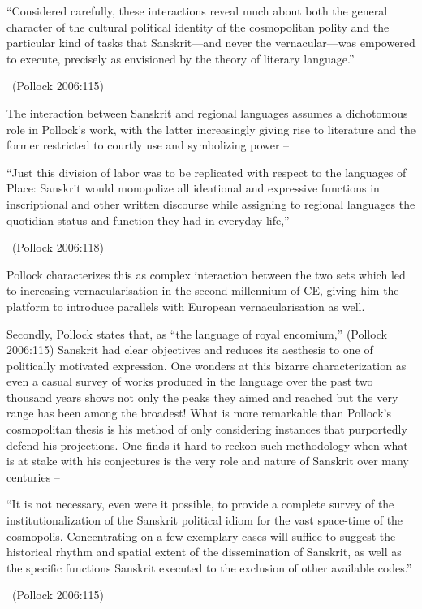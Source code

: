\begin{myquote}
“Considered carefully, these interactions reveal much about both the general character of the cultural political identity of the cosmopolitan polity and the particular kind of tasks that Sanskrit—and never the vernacular—was empowered to execute, precisely as envisioned by the theory of literary language.” 

~\hfill (Pollock 2006:115)
\end{myquote}

The interaction between Sanskrit and regional languages assumes a dichotomous role in Pollock’s work, with the latter increasingly giving rise to literature and the former restricted to courtly use and symbolizing power –

\begin{myquote}
“Just this division of labor was to be replicated with respect to the languages of Place: Sanskrit would monopolize all ideational and expressive functions in inscriptional and other written discourse while assigning to regional languages the quotidian status and function they had in everyday life,” 

~\hfill (Pollock 2006:118)
\end{myquote}

Pollock characterizes this as complex interaction between the two sets which led to increasing vernacularisation in the second millennium of CE, giving him the platform to introduce parallels with European vernacularisation as well.

Secondly, Pollock states that, as “the language of royal encomium,” (Pollock 2006:115) Sanskrit had clear objectives and reduces its aesthesis to one of politically motivated expression. One wonders at this bizarre characterization as even a casual survey of works produced in the language over the past two thousand years shows not only the peaks they aimed and reached but the very range has been among the broadest! What is more remarkable than Pollock’s cosmopolitan thesis is his method of only considering instances that purportedly defend his projections. One finds it hard to reckon such methodology when what is at stake with his conjectures is the very role and nature of Sanskrit over many centuries –

\begin{myquote}
“It is not necessary, even were it possible, to provide a complete survey of the institutionalization of the Sanskrit political idiom for the vast space-time of the cosmopolis. Concentrating on a few exemplary cases will suffice to suggest the historical rhythm and spatial extent of the dissemination of Sanskrit, as well as the specific functions Sanskrit executed to the exclusion of other available codes.” 

~\hfill (Pollock 2006:115)
\end{myquote}

